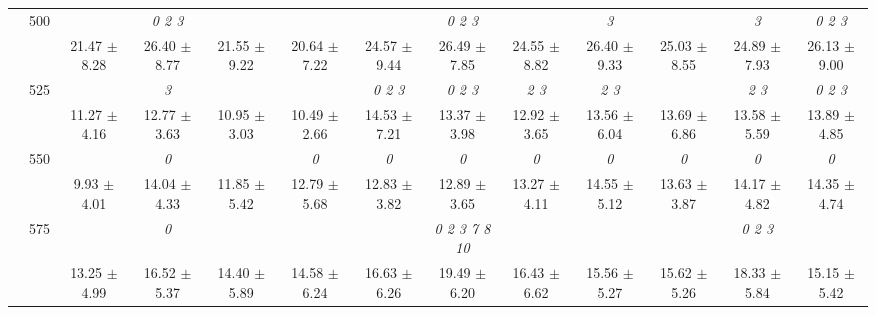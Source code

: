 \begin{table}[h]
{\begin{tabular}{
        ccccccccccccc}
 & \multirow{2}{*}{500}& & \textit{ 0 2 3 }& & & & \textit{ 0 2 3 }& & \textit{ 3 }& & \textit{ 3 }& \textit{ 0 2 3 } \\ 
 & & 21.47 $\pm$ 8.28& 26.40 $\pm$ 8.77& 21.55 $\pm$ 9.22& 20.64 $\pm$ 7.22& 24.57 $\pm$ 9.44& 26.49 $\pm$ 7.85& 24.55 $\pm$ 8.82& 26.40 $\pm$ 9.33& 25.03 $\pm$ 8.55& 24.89 $\pm$ 7.93& 26.13 $\pm$ 9.00 \\ 
 & \multirow{2}{*}{525}& \cellcolor[HTML]{EFEFEF} & \cellcolor[HTML]{EFEFEF} \textit{ 3 }& \cellcolor[HTML]{EFEFEF} & \cellcolor[HTML]{EFEFEF} & \cellcolor[HTML]{EFEFEF} \textit{ 0 2 3 }& \cellcolor[HTML]{EFEFEF} \textit{ 0 2 3 }& \cellcolor[HTML]{EFEFEF} \textit{ 2 3 }& \cellcolor[HTML]{EFEFEF} \textit{ 2 3 }& \cellcolor[HTML]{EFEFEF} & \cellcolor[HTML]{EFEFEF} \textit{ 2 3 }& \cellcolor[HTML]{EFEFEF} \textit{ 0 2 3 } \\ 
 & & \cellcolor[HTML]{EFEFEF} 11.27 $\pm$ 4.16& \cellcolor[HTML]{EFEFEF} 12.77 $\pm$ 3.63& \cellcolor[HTML]{EFEFEF} 10.95 $\pm$ 3.03& \cellcolor[HTML]{EFEFEF} 10.49 $\pm$ 2.66& \cellcolor[HTML]{EFEFEF} 14.53 $\pm$ 7.21& \cellcolor[HTML]{EFEFEF} 13.37 $\pm$ 3.98& \cellcolor[HTML]{EFEFEF} 12.92 $\pm$ 3.65& \cellcolor[HTML]{EFEFEF} 13.56 $\pm$ 6.04& \cellcolor[HTML]{EFEFEF} 13.69 $\pm$ 6.86& \cellcolor[HTML]{EFEFEF} 13.58 $\pm$ 5.59& \cellcolor[HTML]{EFEFEF} 13.89 $\pm$ 4.85 \\ 
 & \multirow{2}{*}{550}& & \textit{ 0 }& & \textit{ 0 }& \textit{ 0 }& \textit{ 0 }& \textit{ 0 }& \textit{ 0 }& \textit{ 0 }& \textit{ 0 }& \textit{ 0 } \\ 
 & & 9.93 $\pm$ 4.01& 14.04 $\pm$ 4.33& 11.85 $\pm$ 5.42& 12.79 $\pm$ 5.68& 12.83 $\pm$ 3.82& 12.89 $\pm$ 3.65& 13.27 $\pm$ 4.11& 14.55 $\pm$ 5.12& 13.63 $\pm$ 3.87& 14.17 $\pm$ 4.82& 14.35 $\pm$ 4.74 \\ 
 & \multirow{2}{*}{575}& \cellcolor[HTML]{EFEFEF} & \cellcolor[HTML]{EFEFEF} \textit{ 0 }& \cellcolor[HTML]{EFEFEF} & \cellcolor[HTML]{EFEFEF} & \cellcolor[HTML]{EFEFEF} & \cellcolor[HTML]{EFEFEF} \textit{  0  2  3  7  8 10 }& \cellcolor[HTML]{EFEFEF} & \cellcolor[HTML]{EFEFEF} & \cellcolor[HTML]{EFEFEF} & \cellcolor[HTML]{EFEFEF} \textit{ 0 2 3 }& \cellcolor[HTML]{EFEFEF}  \\ 
 & & \cellcolor[HTML]{EFEFEF} 13.25 $\pm$ 4.99& \cellcolor[HTML]{EFEFEF} 16.52 $\pm$ 5.37& \cellcolor[HTML]{EFEFEF} 14.40 $\pm$ 5.89& \cellcolor[HTML]{EFEFEF} 14.58 $\pm$ 6.24& \cellcolor[HTML]{EFEFEF} 16.63 $\pm$ 6.26& \cellcolor[HTML]{EFEFEF} 19.49 $\pm$ 6.20& \cellcolor[HTML]{EFEFEF} 16.43 $\pm$ 6.62& \cellcolor[HTML]{EFEFEF} 15.56 $\pm$ 5.27& \cellcolor[HTML]{EFEFEF} 15.62 $\pm$ 5.26& \cellcolor[HTML]{EFEFEF} 18.33 $\pm$ 5.84& \cellcolor[HTML]{EFEFEF} 15.15 $\pm$ 5.42 \\ 

\end{tabular}}
\end{table}
